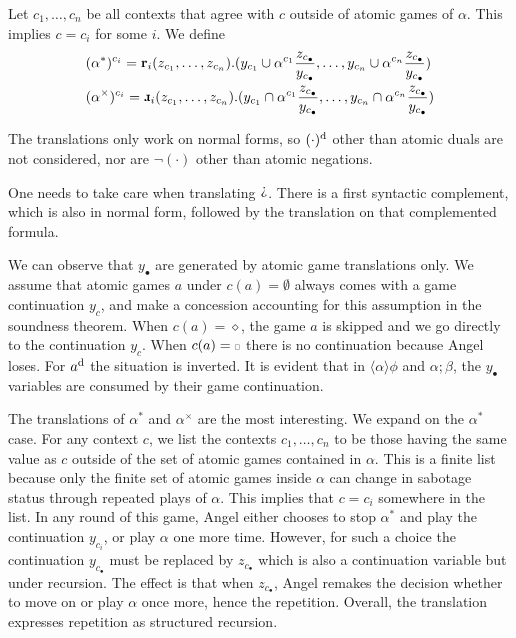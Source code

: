 \begin{bdefinition}
    Let $c_1,\dots,c_n$ be all contexts that agree with $c$ outside of atomic games of $\alpha$. This implies $c=c_i$ for some $i$. We define
    \begin{align*}
        & \GLsrl{c_i}{(\alpha^*)} = \Rec_i(z_{c_1},\dots,z_{c_n}). (y_{c_1}\cup \alpha^{c_1}\frac{z_{c_\bullet}}{y_{c_\bullet}},\dots,y_{c_n}\cup \alpha^{c_n}\frac{z_{c_\bullet}}{y_{c_\bullet}}) \\
    & \GLsrl{c_i}{(\alpha^\times)} = \DRec_i(z_{c_1},\dots,z_{c_n}). (y_{c_1}\cap \alpha^{c_1}\frac{z_{c_\bullet}}{y_{c_\bullet}},\dots,y_{c_n}\cap \alpha^{c_n}\frac{z_{c_\bullet}}{y_{c_\bullet}})  \\
    \end{align*}

\end{bdefinition}

The translations only work on normal forms, so $(\cdot)^\text{d}$ other than atomic duals are not considered, nor are $\neg(\cdot)$ other than atomic negations.

One needs to take care when translating $\DTest$. There is a first syntactic complement, which is also in normal form, followed by the translation on that complemented formula.

We can observe that $y_\bullet$ are generated by atomic game translations only. We assume that atomic games $a$ under $c(a)=\emptyset$ always comes with a game continuation $y_c$, and make a concession accounting for this assumption in the soundness theorem. When $c(a) = \diamond$, the game $a$ is skipped and we go directly to the continuation $y_c$. When $c(a) = \ssquare$ there is no continuation because Angel loses. For $a^\text{d}$ the situation is inverted.
It is evident that in $\langle\alpha\rangle\phi$ and $\alpha; \beta$, the $y_\bullet$ variables are consumed by their game continuation. 

The translations of $\alpha^*$ and $\alpha^\times$ are the most interesting. We expand on the $\alpha^*$ case. For any context $c$, we list the contexts $c_1,\dots,c_n$ to be those having the same value as $c$ outside of the set of atomic games contained in $\alpha$. This is a finite list because only the finite set of atomic games inside $\alpha$ can change in sabotage status through repeated plays of $\alpha$. This implies that $c=c_i$ somewhere in the list. In any round of this game, Angel either chooses to stop $\alpha^*$ and play the continuation $y_{c_i}$, or play $\alpha$ one more time. However, for such a choice the continuation $y_{c_\bullet}$ must be replaced by $z_{c_\bullet}$ which is also a continuation variable but under recursion. The effect is that when $z_{c_\bullet}$, Angel remakes the decision whether to move on or play $\alpha$ once more, hence the repetition. Overall, the translation expresses repetition as structured recursion.

